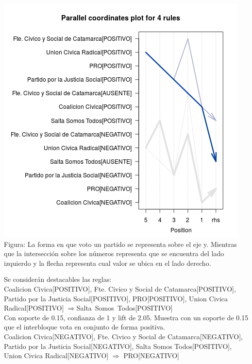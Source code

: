\documentclass{endm}
\begin{document}
\begin{center}
\includegraphics[scale=0.5]{graficos/paracoordInterbloquesCambiemos.png} \\
\scriptsize{Figura: La forma en que voto un partido se representa sobre el eje y. Mientras que la intersección sobre  los números representa que se encuentra del lado izquierdo y la flecha representa cual valor se ubica en el lado derecho.}
\end{center}

Se considerán destacables las reglas: \\

{Coalicion Civica[POSITIVO],
 Fte. Civico y Social de Catamarca[POSITIVO],
 Partido por la Justicia Social[POSITIVO],   
 PRO[POSITIVO], Union Civica Radical[POSITIVO]} $\Longrightarrow${Salta\ Somos\ Todos[POSITIVO]} \\

Con soporte de 0.15, confianza de 1 y lift de 2.05. Muestra  con un soporte de 0.15 que el interbloque vota en conjunto de forma positiva. \\

{Coalicion Civica[NEGATIVO],         
Fte. Civico y Social de Catamarca[NEGATIVO],
Partido por la Justicia Social[NEGATIVO],
Salta Somos Todos[POSITIVO],
Union Civica Radical[NEGATIVO]}  $\Longrightarrow$ {PRO[NEGATIVO]} \\
\end{document}

